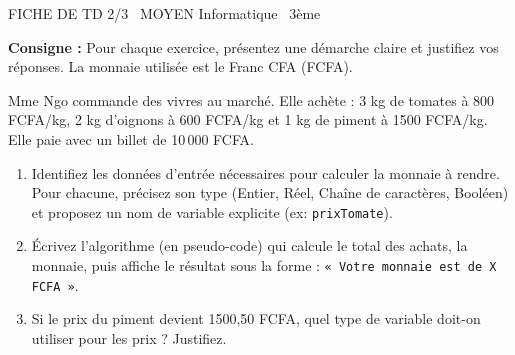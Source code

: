 \documentclass[11pt]{article}
\begin{document}
\begin{tcolorbox}[enhanced,colback=popink,colframe=popink,arc=10pt,boxrule=0pt,left=12pt,right=12pt,top=9pt,bottom=9pt]
{\color{white}\popxbold\small FICHE DE TD 2/3 \textbullet\ MOYEN \hfill Informatique \textbullet\ 3ème\par}
\end{tcolorbox}
\vspace{4pt}
\textbf{Consigne :} Pour chaque exercice, présentez une démarche claire et justifiez vos réponses. La monnaie utilisée est le Franc CFA (FCFA).

\begin{exercice}
Mme Ngo commande des vivres au marché. Elle achète : 3 kg de tomates à 800 FCFA/kg, 2 kg d'oignons à 600 FCFA/kg et 1 kg de piment à 1500 FCFA/kg. Elle paie avec un billet de 10\,000 FCFA.
\begin{enumerate}
    \item Identifiez les données d'entrée nécessaires pour calculer la monnaie à rendre. Pour chacune, précisez son type (Entier, Réel, Chaîne de caractères, Booléen) et proposez un nom de variable explicite (ex: \texttt{prixTomate}).
    \item Écrivez l'algorithme (en pseudo-code) qui calcule le total des achats, la monnaie, puis affiche le résultat sous la forme : \texttt{« Votre monnaie est de X FCFA »}.
    \item Si le prix du piment devient 1500,50 FCFA, quel type de variable doit-on utiliser pour les prix ? Justifiez.
\end{enumerate}
\end{exercice}
\end{document}
